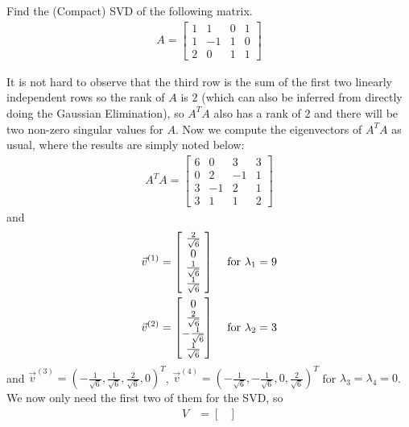 \begin{exmp}
\label{exmp:compactSVD}
Find the (Compact) SVD of the following matrix.
\begin{align*}
A = 
\begin{bmatrix}
1&1&0&1\\ 
1&-1&1&0\\ 
2&0&1&1
\end{bmatrix}
\end{align*}
\end{exmp}
\begin{solution}
It is not hard to observe that the third row is the sum of the first two linearly independent rows so the rank of $A$ is $2$ (which can also be inferred from directly doing the Gaussian Elimination), so $A^TA$ also has a rank of $2$ and there will be two non-zero singular values for $A$. Now we compute the eigenvectors of $A^T A$ as usual, where the results are simply noted below:
\begin{align*}
A^TA = 
\begin{bmatrix}
6&0&3&3\\ 
0&2&-1&1\\ 
3&-1&2&1\\ 
3&1&1&2
\end{bmatrix}
\end{align*}
and
\begin{align*}
\vec{v}^{(1)} &= 
\left[\begin{array}{wc{10pt}}
\frac{2}{\sqrt{6}} \\
0 \\
\frac{1}{\sqrt{6}} \\
\frac{1}{\sqrt{6}}
\end{array}\right]
& \text{ for } \lambda_1 = 9 \\
\vec{v}^{(2)} &= 
\left[\begin{array}{wc{10pt}}
0 \\
\frac{2}{\sqrt{6}} \\
-\frac{1}{\sqrt{6}} \\
\frac{1}{\sqrt{6}}
\end{array}\right]
& \text{ for } \lambda_2 = 3 \\
\end{align*}
and $\vec{v}^{(3)} = (-\frac{1}{\sqrt{6}},\frac{1}{\sqrt{6}},\frac{2}{\sqrt{6}},0)^T$, $\vec{v}^{(4)} = (-\frac{1}{\sqrt{6}},-\frac{1}{\sqrt{6}},0,\frac{2}{\sqrt{6}})^T$ for $\lambda_3 = \lambda_4 = 0$. We now only need the first two of them for the SVD, so
\begin{align*}
V &= 
\begin{bmatrix}

\end{bmatrix}
\end{align*}
\end{solution}
